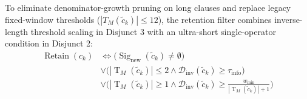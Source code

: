 \documentclass[conference,10pt]{IEEEtran}
\begin{document}
To eliminate denominator-growth pruning on long clauses and replace legacy fixed-window thresholds ($|T_M(\tilde{c}_k)| \le 12$), the retention filter combines inverse-length threshold scaling in Disjunct 3 with an ultra-short single-operator condition in Disjunct 2:
\begin{align}
\label{eq:retention_filter}
\operatorname{Retain}(c_k) &\iff \Big( \operatorname{Sig}_{\text{new}}(\tilde{c}_k) \neq \emptyset \Big) \nonumber \\
&\lor \Big( |\operatorname{T}_M(\tilde{c}_k)| \le 2 \land \mathcal{D}_{\text{inv}}(\tilde{c}_k) \ge \tau_{\text{info}} \Big) \nonumber \\
&\lor \Big( |\operatorname{T}_M(\tilde{c}_k)| \ge 1 \land \mathcal{D}_{\text{inv}}(\tilde{c}_k) \ge \frac{w_{\min}}{|\operatorname{T}_M(\tilde{c}_k)| + 1} \Big)
\end{align}
\end{document}
